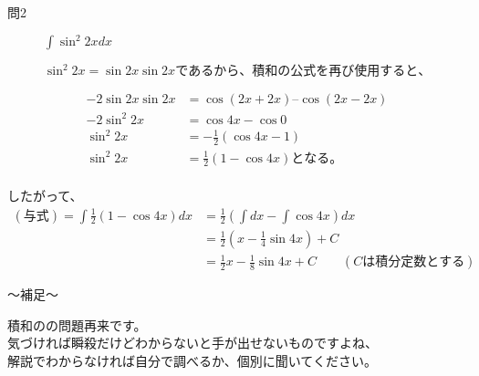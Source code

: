\documentclass[dvipdfmx,uplatex]{jsarticle}
\begin{document}
\begin{description}
    \item [問2] $ \displaystyle \int \sin^2{2x} dx $
\end{description}

\begin{equation*}
    \sin^2{2x} = \sin{2x}\sin{2x}であるから、積和の公式を再び使用すると、
\end{equation*}

\begin{align*}
    -2\sin{2x}\sin{2x} &= \cos(2x+2x) – \cos(2x-2x) \\
    -2\sin^2{2x} &= \cos{4x} - \cos{0} \\
    \sin^2{2x} &= -\frac{1}{2}(\cos4x - 1) \\
    \sin^2{2x} &= \frac{1}{2}(1 - \cos{4x})となる。 \\
\end{align*}

したがって、\\
\begin{align*}
    (与式) = \int\frac{1}{2}(1 - \cos{4x}) dx
    &= \frac{1}{2}(\int{dx} - \int\cos{4x})dx \\
    &= \frac{1}{2}(x - \frac{1}{4}\sin{4x}) + C \\
    &= \frac{1}{2}x - \frac{1}{8}\sin{4x} + C \qquad (Cは積分定数とする)
\end{align*}

\begin{boxnote}
    〜補足〜
    \begin{center}
        積和のの問題再来です。\\
        気づければ瞬殺だけどわからないと手が出せないものですよね、 \\
        解説でわからなければ自分で調べるか、個別に聞いてください。
    \end{center}
\end{boxnote}
\end{document}
